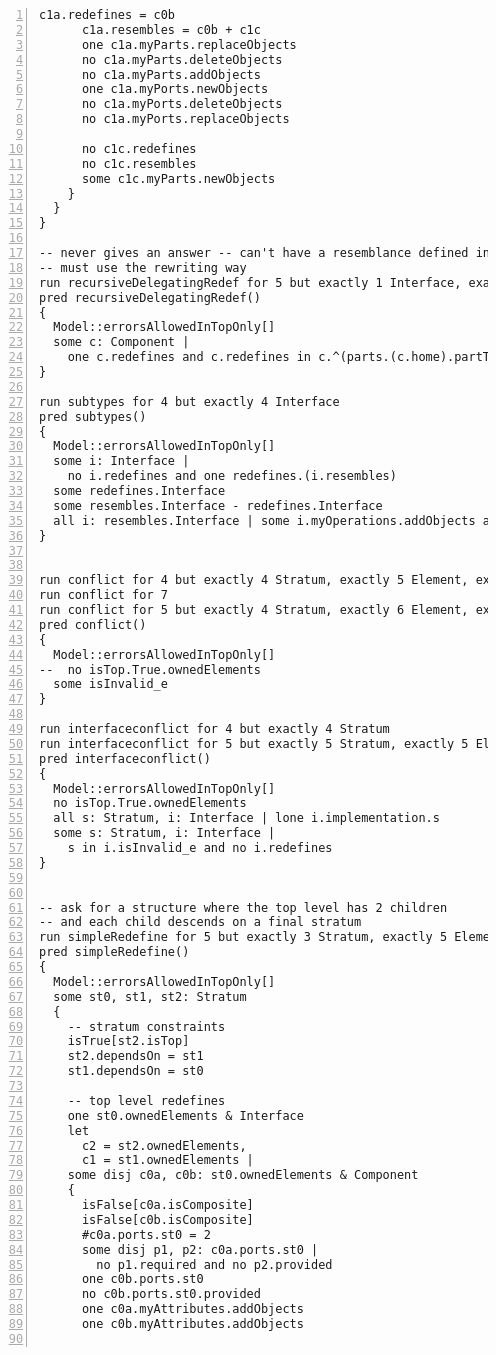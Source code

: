 \begin{lstlisting}[caption={unittests\_redefinition.als}, numbers=left]
      c1a.redefines = c0b
      c1a.resembles = c0b + c1c
      one c1a.myParts.replaceObjects
      no c1a.myParts.deleteObjects
      no c1a.myParts.addObjects
      one c1a.myPorts.newObjects
      no c1a.myPorts.deleteObjects
      no c1a.myPorts.replaceObjects

      no c1c.redefines
      no c1c.resembles
      some c1c.myParts.newObjects
    }
  }
}

-- never gives an answer -- can't have a resemblance defined in terms of delegation to self
-- must use the rewriting way
run recursiveDelegatingRedef for 5 but exactly 1 Interface, exactly 5 Component
pred recursiveDelegatingRedef()
{
  Model::errorsAllowedInTopOnly[]
  some c: Component |
    one c.redefines and c.redefines in c.^(parts.(c.home).partType)
}

run subtypes for 4 but exactly 4 Interface
pred subtypes()
{
  Model::errorsAllowedInTopOnly[]
  some i: Interface |
    no i.redefines and one redefines.(i.resembles)
  some redefines.Interface
  some resembles.Interface - redefines.Interface
  all i: resembles.Interface | some i.myOperations.addObjects and no i.myOperations.deleteObjects
}


run conflict for 4 but exactly 4 Stratum, exactly 5 Element, exactly 4 Component, exactly 1 Interface
run conflict for 7
run conflict for 5 but exactly 4 Stratum, exactly 6 Element, exactly 1 Interface, exactly 5 Component
pred conflict()
{
  Model::errorsAllowedInTopOnly[]
--  no isTop.True.ownedElements
  some isInvalid_e
}

run interfaceconflict for 4 but exactly 4 Stratum
run interfaceconflict for 5 but exactly 5 Stratum, exactly 5 Element, exactly 1 Interface, exactly 4 Component
pred interfaceconflict()
{
  Model::errorsAllowedInTopOnly[]
  no isTop.True.ownedElements
  all s: Stratum, i: Interface | lone i.implementation.s
  some s: Stratum, i: Interface |
    s in i.isInvalid_e and no i.redefines
}


-- ask for a structure where the top level has 2 children
-- and each child descends on a final stratum
run simpleRedefine for 5 but exactly 3 Stratum, exactly 5 Element, exactly 1 Interface, exactly 4 Component, 10 ConnectorEnd, 16 LinkEnd
pred simpleRedefine()
{
  Model::errorsAllowedInTopOnly[]
  some st0, st1, st2: Stratum
  {
    -- stratum constraints
    isTrue[st2.isTop]
    st2.dependsOn = st1
    st1.dependsOn = st0

    -- top level redefines
    one st0.ownedElements & Interface
    let
      c2 = st2.ownedElements,
      c1 = st1.ownedElements |
    some disj c0a, c0b: st0.ownedElements & Component
    {
      isFalse[c0a.isComposite]
      isFalse[c0b.isComposite]
      #c0a.ports.st0 = 2
      some disj p1, p2: c0a.ports.st0 |
        no p1.required and no p2.provided
      one c0b.ports.st0
      no c0b.ports.st0.provided
      one c0a.myAttributes.addObjects
      one c0b.myAttributes.addObjects
      

\end{lstlisting}
